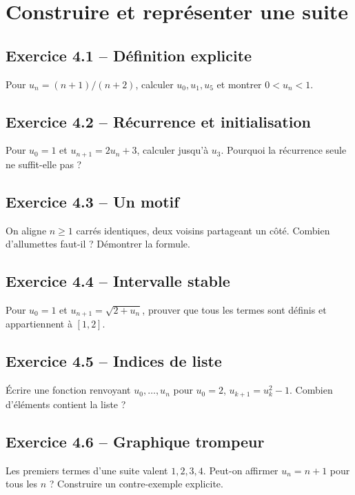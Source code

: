 \chapter{Construire et représenter une suite}
\section*{Exercice 4.1 -- Définition explicite}
Pour $u_n=(n+1)/(n+2)$, calculer $u_0,u_1,u_5$ et montrer $0<u_n<1$.

\section*{Exercice 4.2 -- Récurrence et initialisation}
Pour $u_0=1$ et $u_{n+1}=2u_n+3$, calculer jusqu'à $u_3$. Pourquoi la récurrence seule ne suffit-elle pas ?

\section*{Exercice 4.3 -- Un motif}
On aligne $n\ge1$ carrés identiques, deux voisins partageant un côté. Combien d'allumettes faut-il ? Démontrer la formule.

\section*{Exercice 4.4 -- Intervalle stable}
Pour $u_0=1$ et $u_{n+1}=\sqrt{2+u_n}$, prouver que tous les termes sont définis et appartiennent à $[1,2]$.

\section*{Exercice 4.5 -- Indices de liste}
Écrire une fonction renvoyant $u_0,\ldots,u_n$ pour $u_0=2$, $u_{k+1}=u_k^2-1$. Combien d'éléments contient la liste ?

\section*{Exercice 4.6 -- Graphique trompeur}
Les premiers termes d'une suite valent $1,2,3,4$. Peut-on affirmer $u_n=n+1$ pour tous les $n$ ? Construire un contre-exemple explicite.
